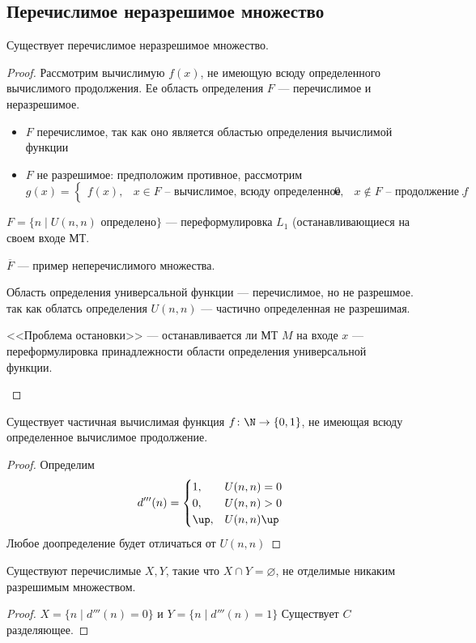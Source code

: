 \subsection{Перечислимое неразрешимое множество}
\begin{thm}
    Существует перечислимое неразрешимое множество.
\end{thm}
\begin{proof}
	Рассмотрим вычислимую $ f(x)$, не имеющую всюду определенного вычислимого продолжения. Ее область определения $ F$ --- перечислимое и неразрешимое.
	\begin{itemize}
		\item $ F$ перечислимое, так как оно является областью определения вычислимой функции
		\item $ F$ не разрешимое: предположим противное,
			рассмотрим 
			 \[
				 g(x) = \begin{cases}
					 f(x), & x \in F \text{ -- вычислимое, всюду определенное} &
					 0, & x \notin F \text{ -- продолжение } f
				 \end{cases}
			.\] 
	\end{itemize}
\begin{note}
	$ F = \{n \mid U(n, n) \text{ определено}\}$ --- переформулировка $ L_1$ (останавливающиеся на своем входе МТ.
\end{note}
\begin{note}
    $ \overline{F}$ --- пример неперечислимого множества.
\end{note}
\begin{note}
    Область определения универсальной функции --- перечислимое, но не разрешмое. 
	так как облатсь определения $ U(n, n)$ --- частично определенная не разрешимая.
\end{note}
\begin{note}
    <<Проблема остановки>> --- останавливается ли МТ $ M$ на входе $ x$ --- переформулировка принадлежности области определения универсальной функции.
\end{note}
\end{proof}


\begin{thm}
    Существует частичная вычислимая функция $ f\colon  \N \to  \{0, 1\}$, не имеющая всюду определенное вычислимое продолжение.
\end{thm}
\begin{proof}
    Определим
	\[
		d'''(n) = \begin{cases}
		1, & U(n, n) = 0 \\
		0, & U(n, n) > 0 \\
		\up, & U(n, n) \up
	\end{cases}
	\] 
	Любое доопределение будет отличаться от $ U(n, n)$
\end{proof}

\begin{cor}
    Существуют перечислимые $ X, Y$, такие что $ X  \cap Y = \varnothing$, не отделимые никаким разрешимым множеством. 
\end{cor}
\begin{proof}
	$ X = \{ n \mid d'''(n) = 0\}$ и  $ Y = \{n \mid d'''(n) =1 \}$
Существует $ C$ разделяющее.
\end{proof}

